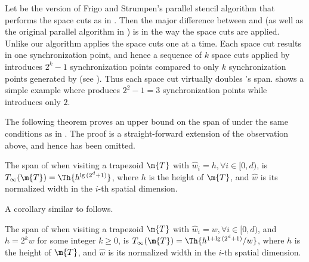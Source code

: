Let  be the version of Frigo and Strumpen's parallel stencil
algorithm \cite{FrigoSt09} that performs the space cuts
as in .
%
Then the major difference between 
and  (as well as the original parallel
algorithm in \cite{FrigoSt09}) is in the way the space cuts 
are applied. Unlike our algorithm  applies
the space cuts one at a time. Each space cut results in
one synchronization point, and hence a sequence of $k$ 
space cuts applied by  introduces $2^k - 1$ synchronization 
points compared to only $k$ synchronization points generated
by  (see ). Thus each space 
cut virtually doubles 's span.
%
 shows a simple example where 
produces $2^2 - 1 = 3$ synchronization points while
 introduces only $2$.

The following theorem proves an upper bound on the
span of  under the same conditions
as in . The proof
is a straight-forward extension of the observation
above, and hence has been omitted.

\begin{theorem}
The span of  when visiting a trapezoid $\m{T}$ 
with ${\widehat{w}}_i = h, \forall{i} \in [0, d)$,
is $T_{\infty}(\m{T}) = \Th{h^{\lg{(2^d + 1)}}}$, where 
$h$ is the height of $\m{T}$, and
${\widehat{w}}$ is its normalized width in the $i$-th 
spatial dimension.
\label{thm:SpaceCutSimpleCase}
\end{theorem}

A corollary similar to 
follows.

\begin{corollary}
The span of  when visiting a trapezoid $\m{T}$ 
with ${\widehat{w}}_i = w, \forall{i} \in [0, d)$,
and $h = 2^k w$ for some integer $k \geq 0$,
is $T_{\infty}(\m{T}) = \Th{ h^{1 + \lg{(2^d + 1)} } / w }$, where 
$h$ is the height of $\m{T}$, and
${\widehat{w}}$ is its normalized width in the $i$-th 
spatial dimension.
\label{cor:SpaceCutSimpleCase}
\end{corollary}



